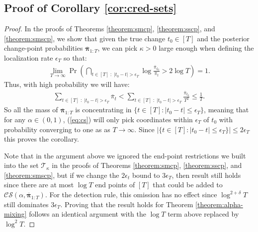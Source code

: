 \subsection{Proof of Corollary \ref{cor:cred-sets}}
\label{app:cor-cred-sets}

\begin{proof}
In the proofs of Theorems \ref{theorem:smcp}, \ref{theorem:sscp}, and \ref{theorem:smscp}, we show that given the true change $t_0\in[T]$ and the posterior change-point probabilities $\overline{\boldsymbol{\pi}}_{1:T}$, we can pick $\kappa > 0$ large enough when defining the localization rate $\epsilon_T$ so that:
\begin{align*}
    \lim_{T\to\infty} \Pr\left(\bigcap_{t \in [T] \;:\; |t_0-t| > \epsilon_T}\log\frac{\overline{\pi}_{t_0}}{\overline{\pi}_t} > 2 \log T\right) = 1.
\end{align*}
Thus, with high probability we will have:
\begin{align*}
    \sum_{t \in [T] \;:\; |t_0-t| > \epsilon_T} \overline{\pi}_t < \sum_{t \in [T] \;:\; |t_0-t| > \epsilon_T} \frac{\overline{\pi}_{t_0}}{T^2} \leq \frac{1}{T}.
\end{align*}
So all the mass of $\overline{\boldsymbol{\pi}}_{1:T}$ is concentrating in $\{t \in [T] : |t_0-t| \leq \epsilon_T\}$, meaning that for any $\alpha \in (0,1)$, (\ref{eq:cs}) will only pick coordinates within $\epsilon_T$ of $t_0$ with probability converging to one as as $T\to\infty$. Since $|\{t \in [T] : |t_0-t| \leq \epsilon_T\}| \leq 2\epsilon_T$ this proves the corollary. 

Note that in the argument above we ignored the end-point restrictions we built into the set $\mathcal{T}_\kappa$ in the proofs of Theorems \ref{theorem:smcp}, \ref{theorem:sscp}, and \ref{theorem:smscp}, but if we change the $2 \epsilon_t$ bound to $3 \epsilon_T$, then result still holds since there are at most $\log T$ end points of $[T]$ that could be added to $\mathcal{CS}(\alpha,\overline{\boldsymbol{\pi}}_{1:T})$. For the detection rule, this omission has no effect since $\log^{2+\delta} T$ still dominates $3\epsilon_T$. Proving that the result holds for Theorem \ref{theorem:alpha-mixing} follows an identical argument with the $\log T$ term above replaced by $\log^2 T$.

\end{proof}
